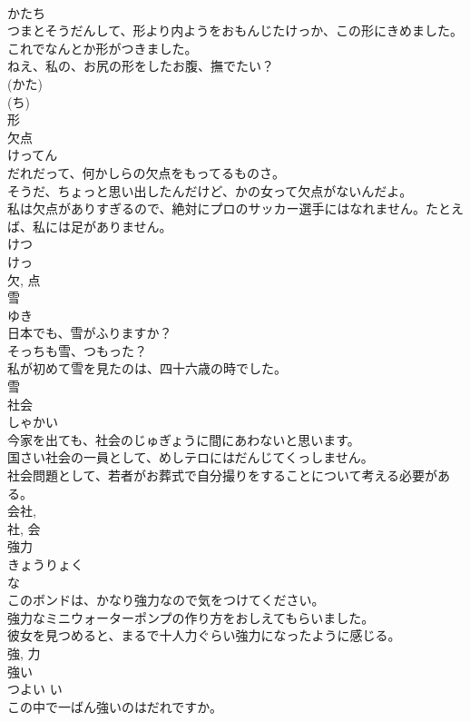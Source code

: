 \documentclass[8pt]{extreport}
\begin{document}
\begin{CJK}{UTF8}{min}
\\	かたち	
\\	つまとそうだんして、形より内ようをおもんじたけっか、この形にきめました。	
\\	これでなんとか形がつきました。	
\\	ねえ、私の、お尻の形をしたお腹、撫でたい？	
\\	(かた) 
\\	(ち) 
\\	形	
\\	欠点	
\\	けってん	
\\	だれだって、何かしらの欠点をもってるものさ。	
\\	そうだ、ちょっと思い出したんだけど、かの女って欠点がないんだよ。	
\\	私は欠点がありすぎるので、絶対にプロのサッカー選手にはなれません。たとえば、私には足がありません。	
\\	けつ 
\\	けっ 
\\	欠, 点	
\\	雪	
\\	ゆき	
\\	日本でも、雪がふりますか？	
\\	そっちも雪、つもった？	
\\	私が初めて雪を見たのは、四十六歳の時でした。	
\\	雪	
\\	社会	
\\	しゃかい	
\\	今家を出ても、社会のじゅぎょうに間にあわないと思います。	
\\	国さい社会の一員として、めしテロにはだんじてくっしません。	
\\	社会問題として、若者がお葬式で自分撮りをすることについて考える必要がある。	
\\	会社, 
\\	社, 会	
\\	強力	
\\	きょうりょく	
\\	な 
\\	このボンドは、かなり強力なので気をつけてください。	
\\	強力なミニウォーターポンプの作り方をおしえてもらいました。	
\\	彼女を見つめると、まるで十人力ぐらい強力になったように感じる。	
\\	強, 力	
\\	強い	
\\	つよい	い 
\\	この中で一ばん強いのはだれですか。	

\end{CJK}
\end{document}
